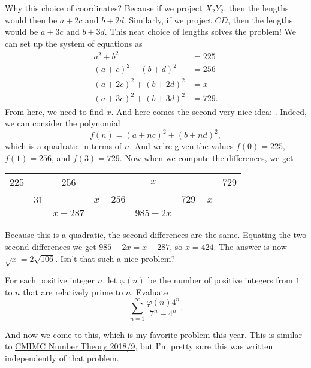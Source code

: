 \documentclass[11pt,paper=letter]{scrartcl}
\begin{document}
Why this choice of coordinates? Because if we project $X_2Y_2$, then the lengths would then be $a + 2c$ and $b + 2d$. Similarly, if we project $CD$, then the lengths would be $a + 3c$ and $b + 3d$. This neat choice of lengths solves the problem! We can set up the system of equations as
\begin{align*}
  a^2 + b^2 &= 225 \\
  (a + c)^2 + (b + d)^2 &= 256 \\
  (a + 2c)^2 + (b + 2d)^2 &= x \\
  (a + 3c)^2 + (b + 3d)^2 &= 729.
\end{align*}
From here, we need to find $x$. And here comes the second very nice idea: . Indeed, we can consider the polynomial
$$f(n) = (a + nc)^2 + (b + nd)^2,$$
which is a quadratic in terms of $n$. And we're given the values $f(0) = 225$, $f(1) = 256$, and $f(3) = 729$. Now when we compute the differences, we get
\begin{center}
\begin{tabular}{ccccccc}
  225 & & 256 & & $x$ & & 729 \\
  & 31 & & $x - 256$ & & $729 - x$ & \\
  & & $x - 287$ & & $985 - 2x$ & &
\end{tabular}
\end{center}
Because this is a quadratic, the second differences are the same. Equating the two second differences we get $985 - 2x = x - 287$, so $x = 424$. The answer is now $\sqrt{x} = 2\sqrt{106}$. Isn't that such a nice problem?

\begin{probboxed}
   For each positive integer $n$, let $\varphi(n)$ be the number of positive integers from $1$ to $n$ that are relatively prime to $n$. Evaluate $$\sum_{n=1}^{\infty} \frac{\varphi(n)4^n}{7^n - 4^n}.$$
\end{probboxed}

And now we come to this, which is my favorite problem this year. This is similar to \href{http://www.cmimc.org/docs/past-tests/2018_NumberTheory.pdf}{CMIMC Number Theory 2018/9}, but I'm pretty sure this was written independently of that problem.
\end{document}

